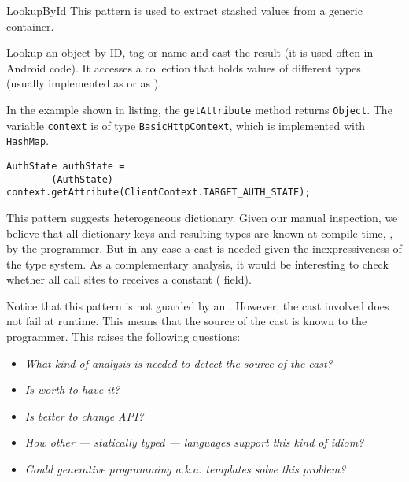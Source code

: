 \begin{pattern}{LookupById}
This pattern is used to extract stashed values from a generic container.

Lookup an object by ID, tag or name and cast the result
(it is used often in Android code).
It accesses a collection that holds values of different types
(usually implemented as  or as ).

\instances


In the example shown in listing,
the \texttt{getAttribute} method returns \texttt{Object}.
The variable \texttt{context} is of type \texttt{BasicHttpContext},
which is implemented with \texttt{HashMap}.

\begin{lstlisting}
AuthState authState =
        (AuthState) context.getAttribute(ClientContext.TARGET_AUTH_STATE);
\end{lstlisting}

\discussion{}
%
%
This pattern suggests heterogeneous dictionary.
Given our manual inspection,
we believe that all dictionary keys and resulting types are known at
compile-time, \ie, by the programmer.
%
%
But in any case a cast is needed given the inexpressiveness of the type system.
As a complementary analysis,
it would be interesting to check whether all call sites to
 receives a constant ( field).

Notice that this pattern is not guarded by an .
However, the cast involved does not fail at runtime.
This means that the source of the cast is known to the programmer.
This raises the following questions:
\begin{itemize}
\item \emph{What kind of analysis is needed to detect the source of the cast?}
\item \emph{Is worth to have it?}
\item \emph{Is better to change API?}
\item \emph{How other --- statically typed --- languages support this kind of idiom?}
\item \emph{Could generative programming a.k.a. templates solve this problem?}
\end{itemize}

\end{pattern}